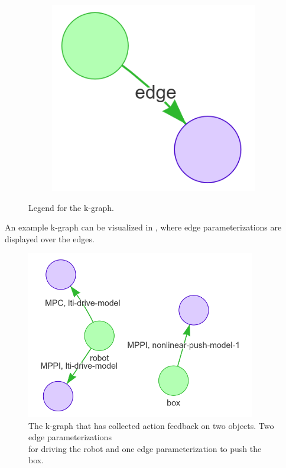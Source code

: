 \begin{figure}[H]
\begin{subfigure}{0.3\textwidth}
    \centering
    \includegraphics[width=\textwidth]{figures/proposed_method/k-graph_edge}
    \caption{}
    \end{subfigure}
    \caption{Legend for the \acl{k-graph}.}%
    \label{fig:k-graph_legend}
\end{figure}

An example \ac{k-graph} can be visualized in , where edge parameterizations are displayed over the edges.\bs

\begin{figure}[H]
    \centering
    \includegraphics[width=10cm]{figures/proposed_method/k-graph_example}
    \caption{The \ac{k-graph} that has collected action feedback on two objects. Two edge parameterizations\\for driving the robot and one edge parameterization to push the box.}%
    \label{fig:k-graph_example}
\end{figure}
